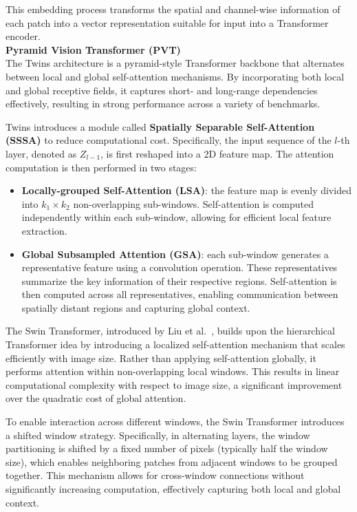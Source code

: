 This embedding process transforms the spatial and channel-wise information of each patch into a vector representation suitable for input into a Transformer encoder.\\
\textbf{Pyramid Vision Transformer (PVT)}\\
The Twins architecture \cite{chu2021twins} is a pyramid-style Transformer backbone that alternates between local and global self-attention mechanisms. By incorporating both local and global receptive fields, it captures short- and long-range dependencies effectively, resulting in strong performance across a variety of benchmarks.

Twins introduces a module called \textbf{Spatially Separable Self-Attention (SSSA)} to reduce computational cost. Specifically, the input sequence of the $l$-th layer, denoted as $Z_{l-1}$, is first reshaped into a 2D feature map. The attention computation is then performed in two stages:

\begin{itemize}
    \item \textbf{Locally-grouped Self-Attention (LSA)}: the feature map is evenly divided into $k_1 \times k_2$ non-overlapping sub-windows. Self-attention is computed independently within each sub-window, allowing for efficient local feature extraction.

    \item \textbf{Global Subsampled Attention (GSA)}: each sub-window generates a representative feature using a convolution operation. These representatives summarize the key information of their respective regions. Self-attention is then computed across all representatives, enabling communication between spatially distant regions and capturing global context.
\end{itemize}

The Swin Transformer, introduced by Liu et al.~\cite{liu2021swin}, builds upon the hierarchical Transformer idea by introducing a localized self-attention mechanism that scales efficiently with image size. Rather than applying self-attention globally, it performs attention within non-overlapping local windows. This results in linear computational complexity with respect to image size, a significant improvement over the quadratic cost of global attention.

To enable interaction across different windows, the Swin Transformer introduces a shifted window strategy. Specifically, in alternating layers, the window partitioning is shifted by a fixed number of pixels (typically half the window size), which enables neighboring patches from adjacent windows to be grouped together. This mechanism allows for cross-window connections without significantly increasing computation, effectively capturing both local and global context.

